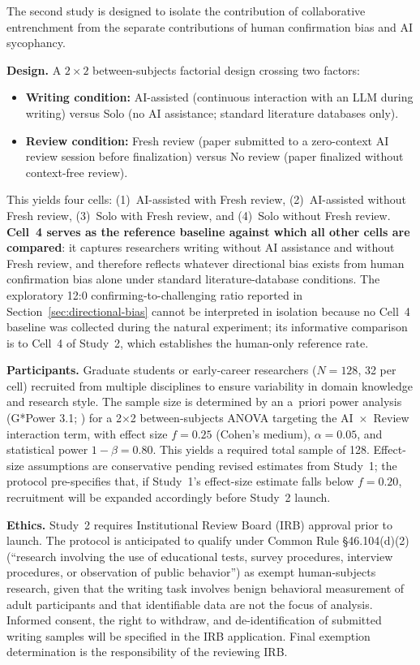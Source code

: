 \documentclass[12pt]{article}
\begin{document}
The second study is designed to isolate the contribution of collaborative entrenchment from the separate contributions of human confirmation bias and AI sycophancy.

\textbf{Design.} A $2 \times 2$ between-subjects factorial design crossing two factors:
\begin{itemize}
    \item \textbf{Writing condition:} AI-assisted (continuous interaction with an LLM during writing) versus Solo (no AI assistance; standard literature databases only).
    \item \textbf{Review condition:} Fresh review (paper submitted to a zero-context AI review session before finalization) versus No review (paper finalized without context-free review).
\end{itemize}

This yields four cells: (1)~AI-assisted with Fresh review, (2)~AI-assisted without Fresh review, (3)~Solo with Fresh review, and (4)~Solo without Fresh review. \textbf{Cell~4 serves as the reference baseline against which all other cells are compared}: it captures researchers writing without AI assistance and without Fresh review, and therefore reflects whatever directional bias exists from human confirmation bias alone under standard literature-database conditions. The exploratory 12:0 confirming-to-challenging ratio reported in Section~\ref{sec:directional-bias} cannot be interpreted in isolation because no Cell~4 baseline was collected during the natural experiment; its informative comparison is to Cell~4 of Study~2, which establishes the human-only reference rate.

\textbf{Participants.} Graduate students or early-career researchers ($N = 128$, 32 per cell) recruited from multiple disciplines to ensure variability in domain knowledge and research style. The sample size is determined by an a~priori power analysis (G*Power 3.1; \citealp{faul2007}) for a 2$\times$2 between-subjects ANOVA targeting the AI~$\times$~Review interaction term, with effect size $f = 0.25$ (Cohen's medium), $\alpha = 0.05$, and statistical power $1{-}\beta = 0.80$. This yields a required total sample of 128. Effect-size assumptions are conservative pending revised estimates from Study~1; the protocol pre-specifies that, if Study~1's effect-size estimate falls below $f = 0.20$, recruitment will be expanded accordingly before Study~2 launch.

\textbf{Ethics.} Study~2 requires Institutional Review Board (IRB) approval prior to launch. The protocol is anticipated to qualify under Common Rule \S46.104(d)(2) (``research involving the use of educational tests, survey procedures, interview procedures, or observation of public behavior'') as exempt human-subjects research, given that the writing task involves benign behavioral measurement of adult participants and that identifiable data are not the focus of analysis. Informed consent, the right to withdraw, and de-identification of submitted writing samples will be specified in the IRB application. Final exemption determination is the responsibility of the reviewing IRB.
\end{document}
